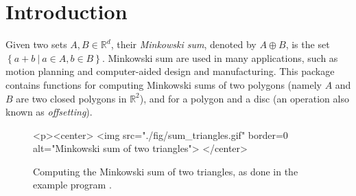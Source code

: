 \lcTex{%
  \newlength{\widthExtra}\setlength{\widthExtra}{1.1cm}
  \newlength{\widthLineReal}\setlength{\widthLineReal}{\linewidth}
  \addtolength{\widthLineReal}{-\widthExtra}
  \newlength{\minipageSpace}\setlength{\minipageSpace}{0.2cm}

  \newlength{\widthLeft}
  \newlength{\widthRight}
}

\newcommand{\reals}{\mathbb{R}}
\newcommand{\calC}{{\cal C}}
\newcommand{\calA}{{\cal A}}
\newcommand{\eps}{{\varepsilon}}
\newcommand{\dcel}{{\sc Dcel}}
\newcommand{\naive}{na\"{\i}ve}
\newcommand{\kdtree}{{\sc Kd}-tree}
\newcommand{\Cpp}{{C}{\tt ++}}

\section{Introduction}
\label{mink_sec:intro}

Given two sets $A,B \in \reals^d$, their \emph{Minkowski sum},
denoted by $A \oplus B$, is the set $\left\{ a + b ~\vert~ a \in
A, b \in B \right\}$. Minkowski sum are used in many applications,
such as motion planning and computer-aided design and
manufacturing. This package contains functions for computing
Minkowski sums of two polygons (namely $A$ and $B$ are two closed
polygons in $\reals^2$), and for a polygon and a disc (an operation
also known as \emph{offsetting}).

\begin{figure}[t]
\begin{ccTexOnly}
  \begin{center}
  
  \end{center}
\end{ccTexOnly}
\begin{ccHtmlOnly}
  <p><center>
  <img src="./fig/sum_triangles.gif" border=0 alt="Minkowski sum of two triangles">
  </center>
\end{ccHtmlOnly}
\caption{Computing the Minkowski sum of two triangles, as done
in the example program .}
\label{mink_fig:sum_tri}
\end{figure}



